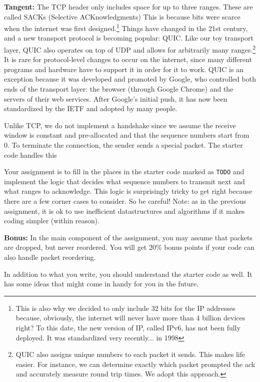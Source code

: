 \documentclass{article}
\begin{document}
\noindent\textbf{Tangent:} The TCP header only includes space for up to three ranges. These are called SACKs (Selective ACKnowledgments) This is because bits were scarce when the internet was first designed.\footnote{This is also why we decided to only include 32 bits for the IP addresses because, obviously, the internet will never have more than 4 billion devices right? To this date, the new version of IP, called IPv6, has not been fully deployed. It was standardized very recently... in 1998} Things have changed in the 21st century, and a new transport protocol is becoming popular: QUIC. Like our toy transport layer, QUIC also operates on top of UDP and allows for arbitrarily many ranges.\footnote{QUIC also assigns unique numbers to each packet it sends. This makes life easier. For instance, we can determine exactly which packet prompted the ack and accurately measure round trip times. We adopt this approach.} It is rare for protocol-level changes to occur on the internet, since many different programs and hardware have to support it in order for it to work. QUIC is an exception because it was developed and promoted by Google, who controlled both ends of the transport layer: the browser (through Google Chrome) and the servers of their web services. After Google's initial push, it has now been standardized by the IETF and adopted by many people.

Unlike TCP, we do not implement a handshake since we assume the receive window is constant and pre-allocated and that the sequence numbers start from 0. To terminate the connection, the sender sends a special packet. The starter code handles this

Your assignment is to fill in the places in the starter code marked as {\tt TODO} and implement the logic that decides what sequence numbers to transmit next and what ranges to acknowledge. This logic is surprisingly tricky to get right because there are a few corner cases to consider. So be careful! Note: as in the previous assignment, it is ok to use inefficient datastructures and algorithms if it makes coding simpler (within reason).

\noindent\textbf{Bonus:} In the main component of the assignment, you may assume that packets are dropped, but never reordered. You will get 20\% bonus points if your code can also handle packet reordering.

In addition to what you write, you should understand the starter code as well. It has some ideas that might come in handy for you in the future.
\end{document}
